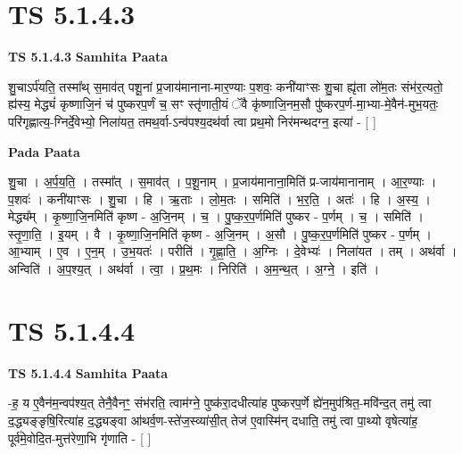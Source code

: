 \documentclass[17pt]{extarticle}
\begin{document}
\section*{ TS 5.1.4.3 }

\textbf{TS 5.1.4.3 } \newline
\textbf{Samhita Paata} \newline

शु॒चाऽर्प॑यति॒ तस्मा᳚थ् स॒माव॑त् पशू॒नां प्र॒जाय॑मानाना-मार॒ण्याः प॒शवः॒ कनी॑याꣳसः शु॒चा ह्यृ॑ता लो॑म॒तः संभ॑र॒त्यतो॒ ह्य॑स्य॒ मेद्ध्यं॑ कृष्णाजि॒नं च॑ पुष्करप॒र्णं च॒ सꣳ स्तृ॑णाती॒यं ॅवै कृ॑ष्णाजि॒नम॒सौ पु॑ष्करप॒र्ण-मा॒भ्या-मे॒वैन॑-मुभ॒यतः॒ परि॑गृह्णात्य॒-ग्निर्दे॒वेभ्यो॒ निला॑यत॒ तमथ॒र्वा-ऽन्व॑पश्य॒दथ॑र्वा त्वा प्रथ॒मो निर॑मन्थदग्न॒ इत्या॑ - [  ] \newline

\textbf{Pada Paata} \newline

शु॒चा । अ॒र्प॒य॒ति॒ । तस्मा᳚त् । स॒माव॑त् । प॒शू॒नाम् । प्र॒जाय॑मानाना॒मिति॑ प्र-जाय॑मानानाम् । आ॒र॒ण्याः । प॒शवः॑ । कनी॑याꣳसः । शु॒चा । हि । ऋ॒ताः । लो॒म॒तः । समिति॑ । भ॒र॒ति॒ । अतः॑ । हि । अ॒स्य॒ । मेद्ध्य᳚म् । कृ॒ष्णा॒जि॒नमिति॑ कृष्ण - अ॒जि॒नम् । च॒ । पु॒ष्क॒र॒प॒र्णमिति॑ पुष्कर - प॒र्णम् । च॒ । समिति॑ । स्तृ॒णा॒ति॒ । इ॒यम् । वै । कृ॒ष्णा॒जि॒नमिति॑ कृष्ण - अ॒जि॒नम् । अ॒सौ । पु॒ष्क॒र॒प॒र्णमिति॑ पुष्कर - प॒र्णम् । आ॒भ्याम् । ए॒व । ए॒न॒म् । उ॒भ॒यतः॑ । परीति॑ । गृ॒ह्णा॒ति॒ । अ॒ग्निः । दे॒वेभ्यः॑ । निला॑यत । तम् । अथ॑र्वा । अन्विति॑ । अ॒प॒श्य॒त् । अथ॑र्वा । त्वा॒ । प्र॒थ॒मः । निरिति॑ । अ॒म॒न्थ॒त् । अ॒ग्ने॒ । इति॑ ।  \newline




\section*{ TS 5.1.4.4 }

\textbf{TS 5.1.4.4 } \newline
\textbf{Samhita Paata} \newline

-ह॒ य ए॒वैन॑म॒न्वप॑श्य॒त् तेनै॒वैनꣳ॒॒ संभ॑रति॒ त्वाम॑ग्ने॒ पुष्क॑रा॒दधीत्या॑ह पुष्करप॒र्णे ह्ये॑न॒मुप॑श्रित॒-मवि॑न्द॒त् तमु॑ त्वा द॒द्ध्यङ्ङृषि॒रित्या॑ह द॒द्ध्यङ्वा आ॑थर्व॒ण-स्ते॑ज॒स्व्या॑सी॒त् तेज॑ ए॒वास्मि॑न् दधाति॒ तमु॑ त्वा पा॒थ्यो वृषेत्या॑ह॒ पूर्व॑मे॒वोदि॒त-मुत्त॑रेणा॒भि गृ॑णाति - [  ] \newline
\end{document}
